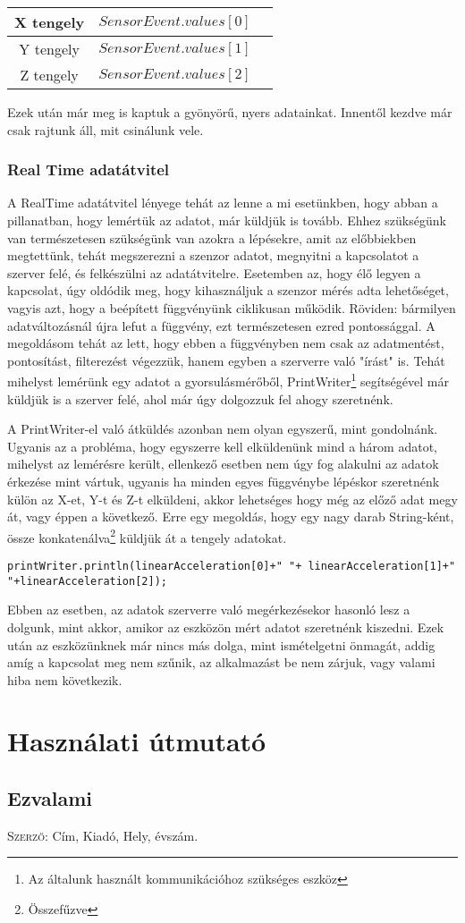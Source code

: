 \documentclass{thesis-ekf}
\theoremstyle{definition}
\theoremstyle{remark}
\begin{document}
\begin{center}
	\begin{tabular}{ |c|c|c| } 
		\hline
		X tengely & $SensorEvent.values[0]$  \\
		\hline
		Y tengely & $SensorEvent.values[1]$\\
		\hline
		Z tengely & $SensorEvent.values[2]$ \\
		\hline
	\end{tabular}
\end{center}
\par Ezek után már meg is kaptuk a gyönyörű, nyers adatainkat. Innentől kezdve már csak rajtunk áll, mit csinálunk vele.
\subsection{Real Time adatátvitel}
A RealTime adatátvitel lényege tehát az lenne a mi esetünkben, hogy abban a pillanatban, hogy lemértük az adatot, már küldjük is tovább. Ehhez szükségünk van természetesen szükségünk van azokra a lépésekre, amit az előbbiekben megtettünk, tehát megszerezni a szenzor adatot, megnyitni a kapcsolatot a szerver felé, és felkészülni az adatátvitelre. Esetemben az, hogy élő legyen a kapcsolat, úgy oldódik meg, hogy kihasználjuk a szenzor mérés adta lehetőséget, vagyis azt, hogy a beépített függvényünk ciklikusan működik. Röviden: bármilyen adatváltozásnál újra lefut a függvény, ezt természetesen ezred pontossággal. A megoldásom tehát az lett, hogy ebben a függvényben nem csak az adatmentést, pontosítást, filterezést végezzük, hanem egyben a szerverre való "írást" is. Tehát mihelyst lemérünk egy adatot a gyorsulásmérőből, PrintWriter\footnote{Az általunk használt kommunikációhoz szükséges eszköz} segítségével már küldjük is a szerver felé, ahol már úgy dolgozzuk fel ahogy szeretnénk.
\par A PrintWriter-el való átküldés azonban nem olyan egyszerű, mint gondolnánk. Ugyanis az a probléma, hogy egyszerre kell elküldenünk mind a három adatot, mihelyst az lemérésre került, ellenkező esetben nem úgy fog alakulni az adatok érkezése mint vártuk, ugyanis ha minden egyes függvénybe lépéskor szeretnénk külön az X-et, Y-t és Z-t elküldeni, akkor lehetséges hogy még az előző adat megy át, vagy éppen a következő. Erre egy megoldás, hogy egy nagy darab String-ként, össze konkatenálva\footnote{Összefűzve} küldjük át a tengely adatokat.
\begin{lstlisting}
printWriter.println(linearAcceleration[0]+" "+ linearAcceleration[1]+" "+linearAcceleration[2]);
\end{lstlisting}
\par Ebben az esetben, az adatok szerverre való megérkezésekor hasonló lesz a dolgunk, mint akkor, amikor az eszközön mért adatot szeretnénk kiszedni. Ezek után az eszközünknek már nincs más dolga, mint ismételgetni önmagát, addig amíg a kapcsolat meg nem szűnik, az alkalmazást be nem zárjuk, vagy valami hiba nem következik.
\chapter{Használati útmutató}
\section{Ezvalami}

\begin{thebibliography}{1}
 \textsc{Szerző}: Cím, Kiadó, Hely, évszám.

\end{thebibliography}
\end{document}
